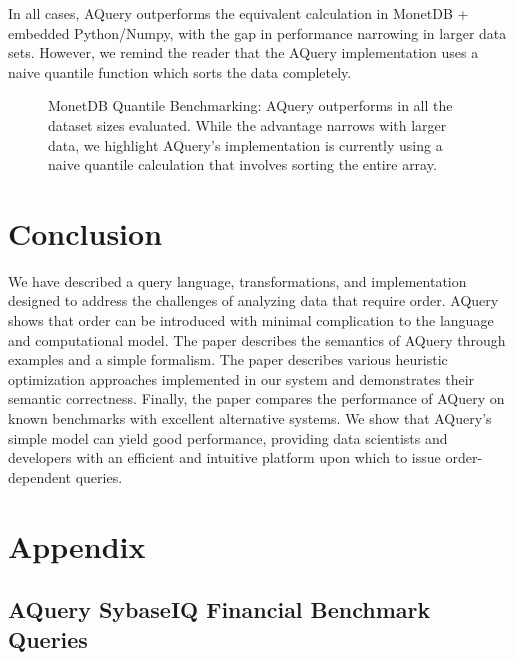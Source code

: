 \documentclass{acm_proc_article-sp}
\begin{document}
In all cases, AQuery outperforms the equivalent calculation in MonetDB + embedded Python/Numpy, with the gap in performance narrowing in larger data sets.  However, we remind the reader that the AQuery implementation uses a naive quantile function which sorts the data completely.

\begin{figure}[!htb]
\caption{MonetDB Quantile Benchmarking: AQuery outperforms in all the dataset sizes evaluated.
While the advantage narrows with larger data, we highlight AQuery's implementation is currently
using a naive quantile calculation that involves sorting the entire array.}
\label{monetdb-benchmark}
\end{figure}

\section{Conclusion}
We have described a query language, transformations, and implementation designed to address the challenges of analyzing
data that require order. AQuery shows that order can be
introduced with minimal complication to the language and computational model. The paper describes 
the semantics of AQuery through examples and a simple formalism.
The paper describes various heuristic optimization approaches 
implemented in our system and demonstrates their semantic 
correctness. Finally, the paper compares the
performance of AQuery on known  benchmarks with 
excellent alternative systems. We show that AQuery's simple model can yield good
performance, providing data scientists and developers with an efficient 
and intuitive platform upon which to issue order-dependent queries.

\clearpage
\section{Appendix}
\subsection{AQuery SybaseIQ Financial Benchmark Queries}
\small
\end{document}
